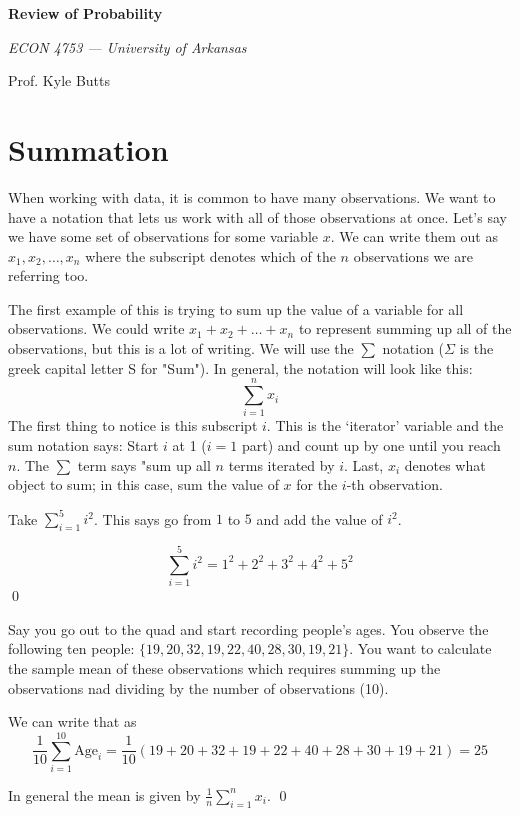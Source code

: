 \documentclass[12pt]{article}
\begin{document}
\begin{center}
  {\Huge\bf Review of Probability}
  
  \smallskip
  {\large\it  ECON 4753 — University of Arkansas}

  \medskip
  {\large Prof. Kyle Butts}
\end{center}

\section{Summation}

When working with data, it is common to have many observations. We want to have a notation that lets us work with all of those observations at once. Let's say we have some set of observations for some variable $x$. We can write them out as $x_1, x_2, \dots, x_n$ where the subscript denotes which of the $n$ observations we are referring too.

The first example of this is trying to sum up the value of a variable for all observations. We could write $x_1 + x_2 + \dots + x_n$ to represent summing up all of the observations, but this is a lot of writing. 
We will use the $\sum$ notation ($\Sigma$ is the greek capital letter S for "Sum"). 
In general, the notation will look like this:
\begin{equation} 
  \sum_{i = 1}^n x_i
\end{equation}
The first thing to notice is this subscript $i$. This is the `iterator' variable and the sum notation says: Start $i$ at 1 ($i = 1$ part) and count up by one until you reach $n$. The $\sum$ term says "sum up all $n$ terms iterated by $i$. Last, $x_i$ denotes what object to sum; in this case, sum the value of $x$ for the $i$-th observation.

\begin{example}
  Take $\sum_{i=1}^5 i^2$. This says go from $1$ to $5$ and add the value of $i^2$. 
  
  $$
    \sum_{i=1}^5 i^2 = 1^2 + 2^2 + 3^2 + 4^2 + 5^2
  $$
  \qed
\end{example}

\begin{example}
  Say you go out to the quad and start recording people's ages. You observe the following ten people: $\{ 19, 20, 32, 19, 22, 40, 28, 30, 19, 21 \}$. You want to calculate the sample mean of these observations which requires summing up the observations nad dividing by the number of observations (10). 
  
  We can write that as
  $$
    \frac{1}{10} \sum_{i=1}^{10} \text{Age}_i = \frac{1}{10} \left( 19 + 20 + 32 + 19 + 22 + 40 + 28 + 30 + 19 + 21 \right) = 25
  $$
  
  In general the mean is given by $\frac{1}{n} \sum_{i=1}^n x_i$. \qed
\end{example}
\end{document}
